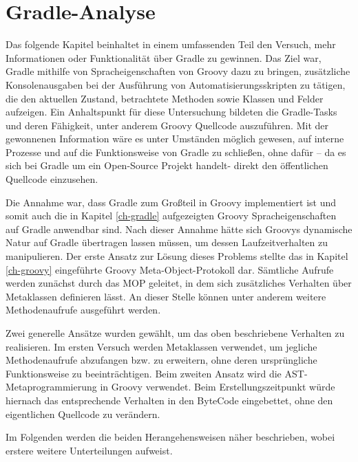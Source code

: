 
\section{Gradle-Analyse}
\label{ch-metaprog}

Das folgende Kapitel beinhaltet in einem umfassenden Teil den Versuch, mehr Informationen oder Funktionalität über Gradle zu gewinnen. 
Das Ziel war, Gradle mithilfe von Spracheigenschaften von Groovy dazu zu bringen, zusätzliche Konsolenausgaben bei der Ausführung von Automatisierungsskripten zu tätigen, die den aktuellen Zustand, betrachtete Methoden sowie Klassen und Felder aufzeigen. 
Ein Anhaltspunkt für diese Untersuchung bildeten die Gradle-Tasks und deren Fähigkeit, unter anderem Groovy Quellcode auszuführen. 
Mit der gewonnenen Information wäre es unter Umständen möglich gewesen, auf interne Prozesse und auf die Funktionsweise von Gradle zu schließen, ohne dafür – da es sich bei Gradle um ein Open-Source Projekt handelt- direkt den öffentlichen Quellcode einzusehen.

Die Annahme war, dass Gradle zum Großteil in Groovy implementiert ist und somit auch die in Kapitel  \ref{ch-gradle} aufgezeigten Groovy Spracheigenschaften auf Gradle anwendbar sind. 
Nach dieser Annahme hätte sich Groovys dynamische Natur auf Gradle übertragen lassen müssen, um dessen Laufzeitverhalten zu manipulieren. 
Der erste Ansatz zur Lösung dieses Problems stellte das in Kapitel \ref{ch-groovy} eingeführte Groovy Meta-Object-Protokoll dar. 
Sämtliche Aufrufe werden zunächst durch das MOP geleitet, in dem sich zusätzliches Verhalten über Metaklassen definieren lässt. An dieser Stelle können unter anderem weitere Methodenaufrufe ausgeführt werden.

Zwei generelle Ansätze wurden gewählt, um das oben beschriebene Verhalten zu realisieren. 
Im ersten Versuch werden Metaklassen verwendet, um jegliche Methodenaufrufe abzufangen bzw. zu erweitern, ohne deren ursprüngliche Funktionsweise zu beeinträchtigen. 
Beim zweiten Ansatz wird die AST-Metaprogrammierung in Groovy verwendet. 
Beim Erstellungszeitpunkt würde hiernach das entsprechende Verhalten in den ByteCode eingebettet, ohne den eigentlichen Quellcode zu verändern.

Im Folgenden werden die beiden Herangehensweisen näher beschrieben, wobei erstere weitere Unterteilungen aufweist.




